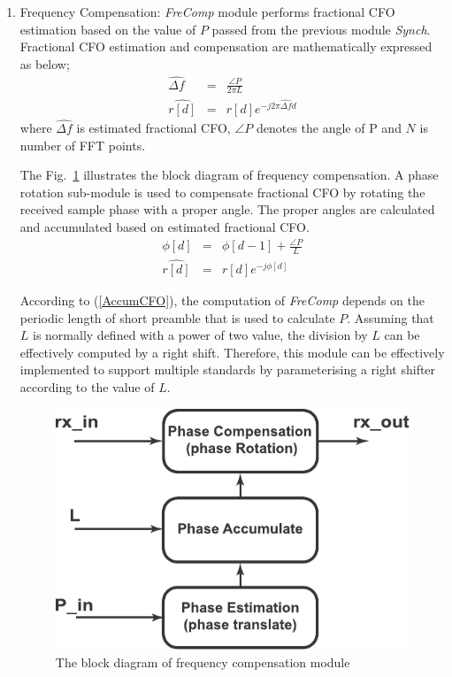 \begin{enumerate}
\item{Frequency Compensation:}
\emph{FreComp} module performs fractional CFO estimation based on the value of $P$ passed from the previous module \emph{Synch}. 
Fractional CFO estimation and compensation are mathematically expressed as below;
\begin{eqnarray}
\label{fractionalCFO}
\widehat{\Delta f } &=& \frac{\angle P}{2\pi L} \nonumber \\
\widehat{r[d]} &=& r[d] e^{-j2\pi\widehat{\Delta f} d}
\end{eqnarray}
where $\widehat{\Delta f }$ is estimated fractional CFO, $\angle P$ denotes the angle of P and $N$ is number of FFT points.

The Fig.~\ref{fig:FFO} illustrates the block diagram of frequency compensation. 
A phase rotation sub-module is used to compensate fractional CFO by rotating the received sample phase with a proper angle.
The proper angles are calculated and accumulated based on estimated fractional CFO.
\begin{eqnarray}
\label{AccumCFO}
\phi[d] &=& \phi[d-1] + \frac{\angle P}{L} \nonumber \\
\widehat{r[d]} &=& r[d] e^{-j \phi[d]}
\end{eqnarray}

According to (\ref{AccumCFO}), the computation of \emph{FreComp} depends on the periodic length of short preamble that is used to calculate $P$. 
Assuming that $L$ is normally defined with a power of two value, the division by $L$ can be effectively computed by a right shift.
Therefore, this module can be effectively implemented to support multiple standards by parameterising a right shifter according to the value of $L$. 
\begin{figure}
\centering
\includegraphics [width=0.5\columnwidth]{Figures/MSCR_RX_FFO.pdf}
\caption{The block diagram of frequency compensation module}
\label{fig:FFO}
\end{figure}


\end{enumerate}
